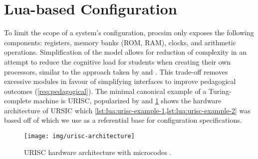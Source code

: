 

\section{Lua-based Configuration}

To limit the scope of a system's configuration, procsim only exposes the following components: registers, memory banks (ROM, RAM), clocks, and arithmetic operations. Simplification of the model allows for reduction of complexity in an attempt to reduce the cognitive load for students when creating their own processors, similar to the approach taken by \cite{Skrien2001} and \cite{Garcia2009}. This trade-off removes excessive modules in favour of simplifying interfaces to improve pedagogical outcomes (\cref{req:pedagogical}). The minimal canonical example of a Turing-complete machine is URISC, popularized by \cite{Mavaddat1988} and \cref{fig:urisc-architecture} shows the hardware architecture of URSIC which \cref{lst:lua:urisc-example-1,lst:lua:urisc-example-2} was based off of which we use as a referential base for configuration specifications.

\begin{figure}[bp!]
    \centering
    \texttt{[image: img/urisc-architecture]}
    \caption{URISC hardware architecture with microcodes \cite{Mavaddat1988}.}
    \label{fig:urisc-architecture}
\end{figure}

\begin{listing}[hp!]
    \inputminted[escapeinside=||, lastline=42]{lua}{./listings/urisc.lua}
    \caption{Configuration of \cref{fig:urisc-architecture} for the URISC processor \cite{Mavaddat1988}.}
    \label{lst:lua:urisc-example-1}
\end{listing}

\begin{listing*}[hp!]
    \inputminted[escapeinside=||, firstline=45]{lua}{./listings/urisc.lua}
    \caption{(Continued) Configuration of \cref{fig:urisc-architecture} for the URISC processor \cite{Mavaddat1988}.}
    \label{lst:lua:urisc-example-2}
\end{listing*}

